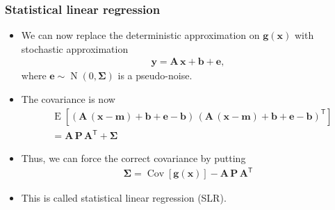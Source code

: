 \documentclass[first=dgreen,second=purple,presentation]{elecslides}
\newcommand{\mbf}[1]{\mathbf{#1}}
\newcommand{\mathbold}[1]{\bm{#1}}
\newcommand{\T}[0]{\mathsf{T}}
\DeclareMathOperator{\Cov}{Cov}
\DeclareMathOperator{\E}{E}
\DeclareMathOperator{\N}{N}
\newcommand{\MSigma}[0]{\mathbold{\Sigma}}
\newcommand{\vb}{\mbf{b}}
\newcommand{\ve}{\mbf{e}}
\newcommand{\vg}{\mbf{g}}
\newcommand{\vm}{\mbf{m}}
\newcommand{\vx}{\mbf{x}}
\newcommand{\vy}{\mbf{y}}
\newcommand{\MA}{\mbf{A}}
\newcommand{\MP}{\mbf{P}}
\begin{document}
\begin{frame}
 \frametitle{Statistical linear regression}

\begin{itemize}[<+->]
\item We can now replace the deterministic approximation on $\vg(\vx)$ with \alert{stochastic approximation}
%
\begin{equation}
\begin{split}
  \vy = \MA \, \vx + \vb + \ve,
\end{split}
\nonumber
\end{equation}
%
where $\ve \sim \N(0,\MSigma)$ is a \alert{pseudo-noise}.

\item The \alert{covariance} is now
%
\begin{equation}
\begin{split}
  &\E\left[ (\MA \, (\vx - \vm) + \vb + \ve - \vb) \, (\MA \, (\vx - \vm) + \vb + \ve - \vb)^\T \right] \\
  &= \MA \, \MP \, \MA^\T + \MSigma
\end{split}
\nonumber
\end{equation}

\item Thus, we can \alert{force the correct covariance} by putting
%
\begin{equation}
\begin{split}
  \MSigma = \Cov\left[ \vg(\vx) \right] - \MA \, \MP \, \MA^\T
\end{split}
\nonumber
\end{equation}

\item This is called \alert{statistical linear regression (SLR)}.
\end{itemize}
\end{frame}
\end{document}
